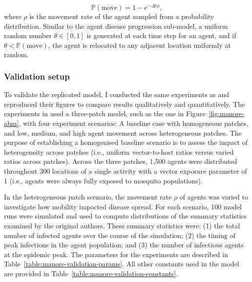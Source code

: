 \begin{equation}
    \mathbb{P}(\text{move})=1-e^{-\Delta t\rho},
\end{equation}
where $\rho$ is the movement rate of the agent sampled from a probability distribution. Similar to the agent disease progression sub-model, a uniform random number $\theta\in[0,1]$ is generated at each time step for an agent, and if $\theta<\mathbb{P}(\text{move})$, the agent is relocated to any adjacent location uniformly at random.

\subsubsection{Validation setup}

To validate the replicated model, I conducted the same experiments as \citet{manore_network-patch_2015} and reproduced their figures to compare results qualitatively and quantitatively. The experiments in \citet{manore_network-patch_2015} used a three-patch model, such as the one in Figure~\ref{fig:manore-abm}, with four experiment scenarios: A baseline case with homogeneous patches, and low, medium, and high agent movement across heterogeneous patches. The purpose of establishing a homogenised baseline scenario is to assess the impact of heterogeneity across patches (i.e., uniform vector-to-host ratios versus varied ratios across patches). Across the three patches, 1,500 agents were distributed throughout 300 locations of a single activity with a vector exposure parameter of 1 (i.e., agents were always fully exposed to mosquito populations).

In the heterogeneous patch scenario, the movement rate $\rho$ of agents was varied to investigate how mobility impacted disease spread. For each scenario, 100 model runs were simulated and used to compute distributions of the summary statistics examined by the original authors. These summary statistics were: (1) the total number of infected agents over the course of the simulation; (2) the timing of peak infections in the agent population; and (3) the number of infectious agents at the epidemic peak. The parameters for the experiments are described in Table~\ref{table:manore-validation-params}. All other constants used in the model are provided in Table~\ref{table:manore-validation-constants}.

